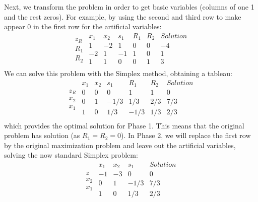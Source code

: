   Next, we transform the problem in order to get  basic variables (columns of one 1 and the rest zeros). For example, by using the second and third row to make appear 0 in the first row for the artificial variables:
  \begin{equation*}
    \begin{array}{c}
    \\
    z_R\\
    R_1\\
    R_2\\
    \end{array}
    \begin{array}{ccccc|c}
       x_1 & x_2 & s_1 & R_1 & R_2 & Solution \\ \hline
       1 & -2 & 1 & 0 & 0 & -4 \\ \hline
       -2 & 1 & -1 & 1 & 0 & 1  \\
       1 & 1 & 0 & 0 & 1 & 3 \\
    \end{array}
  \end{equation*}
  We can solve this problem with the Simplex method, obtaining a tableau:
  \begin{equation*}
    \begin{array}{c}
    \\
    z_R\\
    x_2\\
    x_1\\
    \end{array}
    \begin{array}{ccccc|c}
       x_1 & x_2 & s_1 & R_1 & R_2 & Solution \\ \hline
       0 & 0 & 0 & 1 & 1 & 0 \\ \hline
       0 & 1 & -1/3 & 1/3 & 2/3 & 7/3  \\
       1 & 0 & 1/3 & -1/3 & 1/3 & 2/3 \\
    \end{array}
  \end{equation*}
    which provides the optimal solution for Phase 1. This means that the original problem has solution (as $R_1=R_2=0$). In Phase 2, we will replace the first row by the original maximization problem and leave out the artificial variables, solving the now standard Simplex problem:
    \begin{equation*}
      \begin{array}{c}
        \\
        z\\
        x_2\\
        x_1\\
      \end{array}
      \begin{array}{ccc|c}
        x_1 & x_2 & s_1 &  Solution \\ \hline
        -1 & -3 & 0 &  0 \\ \hline
        0 & 1 & -1/3 & 7/3  \\
        1 & 0 & 1/3  & 2/3 \\
      \end{array}
    \end{equation*}
